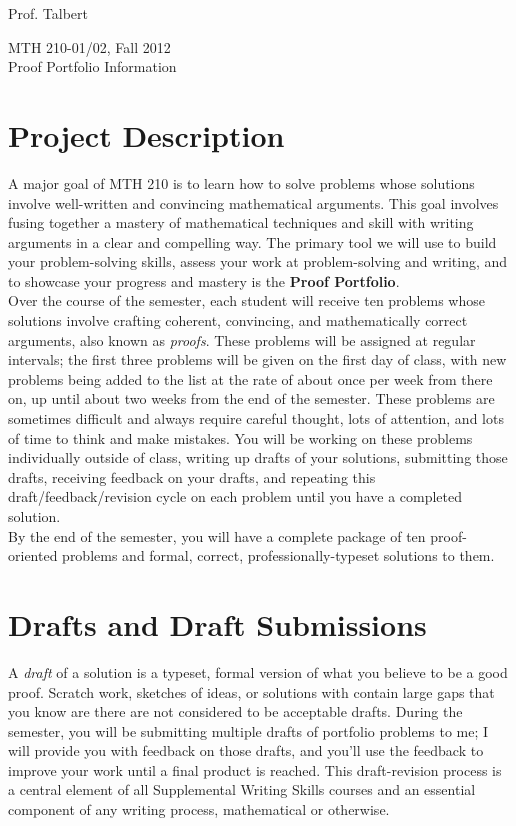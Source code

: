 \documentclass[11pt]{article}
\begin{document}
		
\hfill Prof. Talbert
\begin{center}
\large{MTH 210-01/02, Fall 2012 \\
Proof Portfolio Information}
\end{center}

\section{Project Description}

A major goal of MTH 210 is to learn how to solve problems whose solutions involve well-written and convincing mathematical arguments. This goal involves fusing together a mastery of mathematical techniques and skill with writing arguments in a clear and compelling way. The primary tool we will use to build your problem-solving skills, assess your work at problem-solving and writing, and to showcase your progress and mastery is the \textbf{Proof Portfolio}. \\

Over the course of the semester, each student will receive ten problems whose solutions involve crafting coherent, convincing, and mathematically correct arguments, also known as \emph{proofs}. These problems will be assigned at regular intervals; the first three problems will be given on the first day of class, with new problems being added to the list at the rate of about once per week from there on, up until about two weeks from the end of the semester. These problems are sometimes difficult and always require careful thought, lots of attention, and lots of time to think and make mistakes. You will be working on these problems individually outside of class, writing up drafts of your solutions, submitting those drafts, receiving feedback on your drafts, and repeating this draft/feedback/revision cycle on each problem until you have a completed solution. \\

By the end of the semester, you will have a complete package of ten proof-oriented problems and formal, correct, professionally-typeset solutions to them.  \\

\section{Drafts and Draft Submissions}

A \emph{draft} of a solution is a typeset, formal version of what you believe to be a good proof. Scratch work, sketches of ideas, or solutions with contain large gaps that you know are there are not considered to be acceptable drafts. During the semester, you will be submitting multiple drafts of portfolio problems to me; I will provide you with feedback on those drafts, and you'll use the feedback to improve your work until a final product is reached. This draft-revision process is a central element of all Supplemental Writing Skills courses and an essential component of any writing process, mathematical or otherwise. \\
\end{document}
